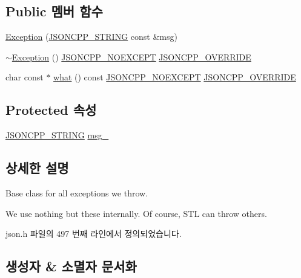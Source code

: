 \subsection*{Public 멤버 함수}
\begin{DoxyCompactItemize}
\item 
\hyperlink{class_json_1_1_exception_ae764aa42e0755bd4ce9d303e2733fa8f}{Exception} (\hyperlink{json_8h_a1e723f95759de062585bc4a8fd3fa4be}{J\+S\+O\+N\+C\+P\+P\+\_\+\+S\+T\+R\+I\+NG} const \&msg)
\item 
\hyperlink{class_json_1_1_exception_add6af5e0ecdf36f40d7f3554b9786e21}{$\sim$\+Exception} () \hyperlink{json_8h_af8418c6d82d9de6e5f3c739fcf2fe88d}{J\+S\+O\+N\+C\+P\+P\+\_\+\+N\+O\+E\+X\+C\+E\+PT} \hyperlink{json_8h_a824d6199c91488107e443226fa6022c5}{J\+S\+O\+N\+C\+P\+P\+\_\+\+O\+V\+E\+R\+R\+I\+DE}
\item 
char const  $\ast$ \hyperlink{class_json_1_1_exception_a70b7ce35e761fb93e8cd338e04619cd6}{what} () const \hyperlink{json_8h_af8418c6d82d9de6e5f3c739fcf2fe88d}{J\+S\+O\+N\+C\+P\+P\+\_\+\+N\+O\+E\+X\+C\+E\+PT} \hyperlink{json_8h_a824d6199c91488107e443226fa6022c5}{J\+S\+O\+N\+C\+P\+P\+\_\+\+O\+V\+E\+R\+R\+I\+DE}
\end{DoxyCompactItemize}
\subsection*{Protected 속성}
\begin{DoxyCompactItemize}
\item 
\hyperlink{json_8h_a1e723f95759de062585bc4a8fd3fa4be}{J\+S\+O\+N\+C\+P\+P\+\_\+\+S\+T\+R\+I\+NG} \hyperlink{class_json_1_1_exception_aae3cbb8b45bf21480f64502a8329659f}{msg\+\_\+}
\end{DoxyCompactItemize}


\subsection{상세한 설명}
Base class for all exceptions we throw.

We use nothing but these internally. Of course, S\+TL can throw others. 

json.\+h 파일의 497 번째 라인에서 정의되었습니다.



\subsection{생성자 \& 소멸자 문서화}
\mbox{\label{class_json_1_1_exception_ae764aa42e0755bd4ce9d303e2733fa8f}} 
